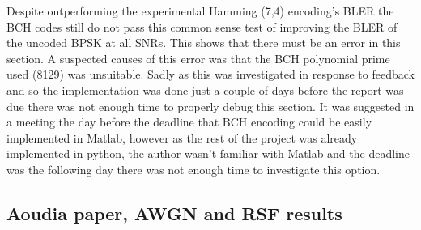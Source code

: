 \documentclass[12pt,onecolumn,letterpaper]{article}
\begin{document}
Despite outperforming the experimental Hamming (7,4) encoding's BLER the BCH codes still do not pass this common sense test of improving the BLER of the uncoded BPSK at all SNRs. This shows that there must be an error in this section. A suspected causes of this error was that the BCH polynomial prime used (8129) was unsuitable. Sadly as this was investigated in response to feedback and so the implementation was done just a couple of days before the report was due there was not enough time to properly debug this section. It was suggested in a meeting the day before the deadline that BCH encoding could be easily implemented in Matlab, however as the rest of the project was already implemented in python, the author wasn't familiar with Matlab and the deadline was the following day there was not enough time to investigate this option. 

\subsection{Aoudia \etal paper, AWGN and RSF results}
\end{document}
